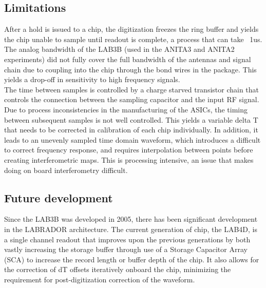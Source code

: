 	\subsection{Limitations}
	After a hold is issued to a chip, the digitization freezes the ring buffer and yields the chip unable to sample until readout is complete, a process that can take ~1us. \\
	The analog bandwidth of the LAB3B (used in the ANITA3 and ANITA2 experiments) did not fully cover the full bandwidth of the antennas and signal chain due to coupling into the chip through the bond wires in the package.  This yields a drop-off in sensitivity to high frequency signals. \\
	The time between samples is controlled by a charge starved transistor chain that controls the connection between the sampling capacitor and the input RF signal.  Due to process inconsistencies in the manufacturing of the ASICs, the timing between subsequent samples is not well controlled.  This yields a variable delta T that needs to be corrected in calibration of each chip individually.  In addition, it leads to an unevenly sampled time domain waveform, which introduces a difficult to correct frequency response, and requires interpolation between points before creating interferometric maps.  This is processing intensive, an issue that makes doing on board interferometry difficult.
	
	\subsection{Future development}
	Since the LAB3B was developed in 2005, there has been significant development in the LABRADOR architecture.  The current generation of chip, the LAB4D, is a single channel readout that improves upon the previous generations by both vastly increasing the storage buffer through use of a Storage Capacitor Array (SCA) to increase the record length or buffer depth of the chip.  It also allows for the correction of dT offsets iteratively onboard the chip, minimizing the requirement for post-digitization correction of the waveform.
	
			
		
